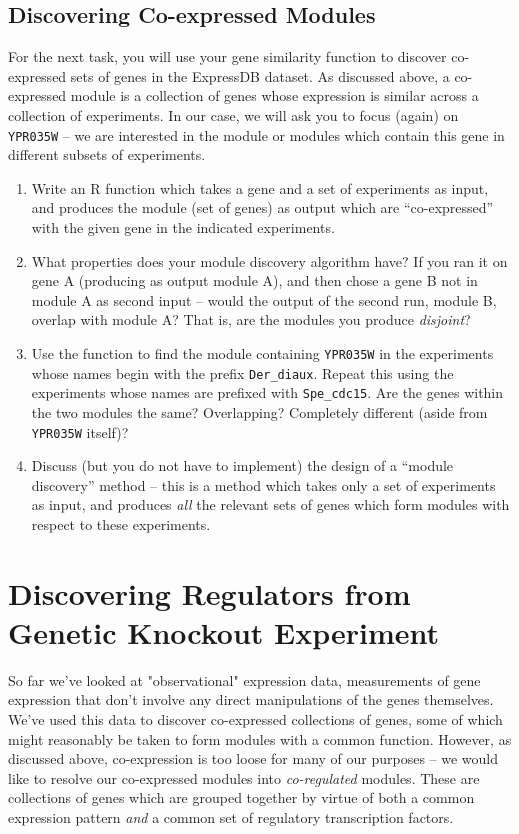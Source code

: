 \documentclass{article}
\newcommand{\gene}[1]{\texttt{#1}}
\begin{document}
\subsection{Discovering Co-expressed Modules}

For the next task, you will use your gene similarity function to discover co-expressed sets of genes in the ExpressDB dataset.
As discussed above, a co-expressed module is a collection of genes whose expression is similar across a collection of experiments.  
In our case, we will ask you to focus (again) on \gene{YPR035W} -- we are interested in the module or modules which contain this gene in different subsets of experiments.  

\begin{enumerate}
\item Write an R function which takes a gene and a set of experiments as input, and produces the module (set of genes) as output which are ``co-expressed'' with the given gene in the indicated experiments. 
\item What properties does your module discovery algorithm have?  If you ran it on gene A (producing as output module A), and then chose a gene B not in module A as second input -- would the output of the second run, module B, overlap with module A?  That is, are the modules you produce \emph{disjoint}?  
\item Use the function to find the module containing \gene{YPR035W} in the experiments whose names begin with the prefix \texttt{Der\_diaux}.   Repeat this using the experiments whose names are prefixed with \texttt{Spe\_cdc15}.  Are the genes within the two modules the same?  Overlapping?  Completely different (aside from \gene{YPR035W} itself)?   
\item Discuss (but you do not have to implement) the design of a ``module discovery'' method -- this is a method which takes only a set of experiments as input, and produces \emph{all} the relevant sets of genes which form modules with respect to these experiments.  
\end{enumerate}

\section{Discovering Regulators from Genetic Knockout Experiment}

So far we've looked at "observational" expression data, measurements of gene expression that don't involve any direct manipulations of the genes themselves.   
We've used this data to discover co-expressed collections of genes, some of which might reasonably be taken to form modules with a common function.  
However, as discussed above, co-expression is too loose for many of our purposes -- we would like to resolve our co-expressed modules into \emph{co-regulated} modules.  
These are collections of genes which are grouped together by virtue of both a common expression pattern \emph{and} a common set of regulatory transcription factors.  
\end{document}
